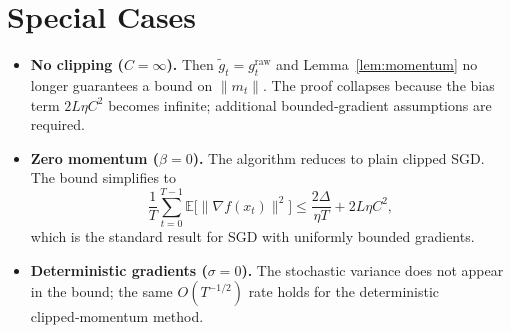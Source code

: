 \documentclass{article}
\begin{document}
\section*{Special Cases}
\begin{itemize}
\item \textbf{No clipping ($C=\infty$).} Then $\tilde g_t=g_t^{\text{raw}}$ and Lemma~\ref{lem:momentum} no longer guarantees a bound on $\|m_t\|$. The proof collapses because the bias term $2L\eta C^2$ becomes infinite; additional bounded‑gradient assumptions are required.
\item \textbf{Zero momentum ($\beta=0$).} The algorithm reduces to plain clipped SGD. The bound simplifies to
\[
\frac{1}{T}\sum_{t=0}^{T-1}\mathbb{E}\bigl[\|\nabla f(x_t)\|^2\bigr]
\le \frac{2\Delta}{\eta T}+2L\eta C^2,
\]
which is the standard result for SGD with uniformly bounded gradients.
\item \textbf{Deterministic gradients ($\sigma=0$).} The stochastic variance does not appear in the bound; the same $O(T^{-1/2})$ rate holds for the deterministic clipped‑momentum method.
\end{itemize}
\end{document}
